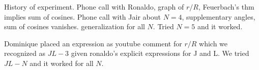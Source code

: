  

History of experiment. Phone call with Ronaldo, graph of $r/R$, Feuerbach's thm implies sum of cosines. Phone call with Jair about $N=4$, supplementary angles, sum of cosines vanishes. generalization for all $N$. Tried $N=5$ and it worked.

Dominique placed an expression as youtube comment for $r/R$ which we recognized as $J L - 3$ given ronaldo's explicit expressions for J and L. We tried $J L - N$ and it worked for all $N$.